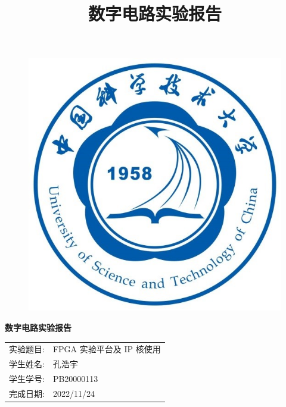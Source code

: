 \documentclass{article}
\title{\heiti 数字电路实验报告 }
\begin{document}
	\vspace*{1cm}
	
	\begin{figure}[h]
		\centering
		\includegraphics[scale=1.0]{xh.jpg}
	\end{figure}

	\vspace*{0.5cm}
	
	\begin{center}
		\Huge{\textbf{数字电路实验报告}}
	\end{center}
	
	\vspace{5cm}
	
	\begin{table}[h]
		\centering
		\begin{Large}
			\begin{tabular}{p{3cm} p{7cm}<{\centering}}
				实验题目: &   FPGA 实验平台及 IP 核使用     \\ \cline{2-2}
				学生姓名:      & 孔浩宇   \\ \cline{2-2}
				学生学号: & PB20000113 \\ \cline{2-2}
				完成日期:       & 2022/11/24 \\ \cline{2-2}
			\end{tabular}
		\end{Large}		
	\end{table}
	\newpage
\end{document}
